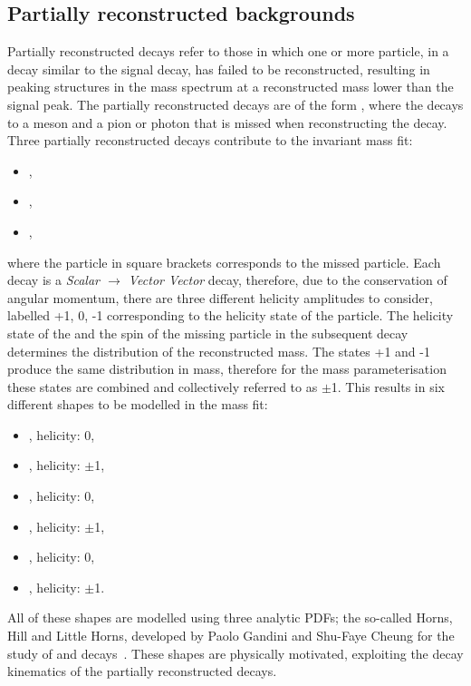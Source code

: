 \subsection{Partially reconstructed backgrounds}
\label{sec:massfit:partreco}

Partially reconstructed decays refer to those in which one or more particle, in a \B decay similar to the signal decay, has failed to be reconstructed, resulting in peaking structures in the \B mass spectrum at a reconstructed mass lower than the signal peak. The partially reconstructed decays are of the form \decay{\B}{\Dstar\Kstar}, where the \Dstar decays to a \Dz meson and a pion or photon that is missed when reconstructing the decay. Three partially reconstructed decays contribute to the invariant mass fit:

\begin{itemize}
\item{\decay{\Bm}{(\decay{\Dstarz}{\Dz[\piz]})\Kstarm},}
\item{\decay{\Bm}{(\decay{\Dstarz}{\Dz[\gamma]})\Kstarm},}
\item{\decay{\Bd}{(\decay{\Dstarp}{\Dz[\pip]})\Kstarm},}
\end{itemize}
where the particle in square brackets corresponds to the missed particle. Each \decay{\B}{\Dstar\Kstar} decay is a {\textit{Scalar $\to$ Vector Vector}} decay, therefore, due to the conservation of angular momentum, there are three different helicity amplitudes to consider, labelled +1, 0, -1 corresponding to the helicity state of the \Dstar particle. The helicity state of the \Dstar and the spin of the missing particle in the subsequent \Dstar decay determines the distribution of the reconstructed \B mass. The states +1 and -1 produce the same distribution in \Bm mass, therefore for the mass parameterisation these states are combined and collectively referred to as $\pm$1. This results in six different shapes to be modelled in the mass fit:
\begin{itemize}
\item{\decay{\Bm}{(\decay{\Dstarz}{\Dz[\piz]})\Kstarm}, \Dstarz helicity: 0,} 
\item{\decay{\Bm}{(\decay{\Dstarz}{\Dz[\piz]})\Kstarm}, \Dstarz helicity: $\pm$1,} 
\item{\decay{\Bm}{(\decay{\Dstarz}{\Dz[\gamma]})\Kstarm}, \Dstarz helicity: 0,}
\item{\decay{\Bm}{(\decay{\Dstarz}{\Dz[\gamma]})\Kstarm}, \Dstarz helicity: $\pm$1,}
\item{\decay{\Bd}{(\decay{\Dstarp}{\Dz[\pip]})\Kstarm}, \Dstarp helicity: 0,}
\item{\decay{\Bd}{(\decay{\Dstarp}{\Dz[\pip]})\Kstarm}, \Dstarp helicity: $\pm$1.}
\end{itemize}
All of these shapes are modelled using three analytic PDFs; the so-called Horns, Hill and Little Horns, developed by Paolo Gandini and Shu-Faye Cheung for the study of  and \decay{\Bz}{\D\Kstarz} decays~\cite{LHCb-PAPER-2017-021,LHCb-PAPER-2016-006}. These shapes are physically motivated, exploiting the decay kinematics of the partially reconstructed decays.

